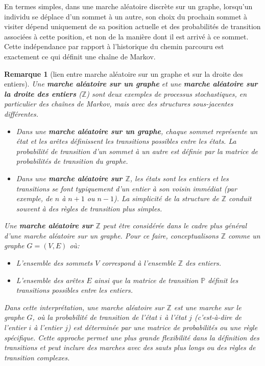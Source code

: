 \documentclass{article}
\theoremstyle{pasdepoint}
\theoremstyle{break}
\theoremstyle{pasdepoint}
\newtheorem*{remark}{Remarque}
\begin{document}
En termes simples, dans une marche aléatoire discrète sur un graphe, lorsqu'un individu se déplace d'un sommet à un autre, son choix du prochain sommet à visiter dépend uniquement de sa position actuelle et des probabilités de transition associées à cette position, et non de la manière dont il est arrivé à ce sommet. Cette indépendance par rapport à l'historique du chemin parcouru est exactement ce qui définit une chaîne de Markov.

\begin{remark}[lien entre marche aléatoire sur un graphe et sur la droite des entiers]
    Une \textbf{marche aléatoire sur un graphe} et une \textbf{marche aléatoire sur la droite des entiers} (\(\mathbb{Z}\)) sont deux exemples de processus stochastiques, en particulier des chaînes de Markov, mais avec des structures sous-jacentes différentes.

\begin{itemize}
    \item Dans une \textbf{marche aléatoire sur un graphe}, chaque sommet représente un état et les arêtes définissent les transitions possibles entre les états. La probabilité de transition d'un sommet à un autre est définie par la matrice de probabilités de transition du graphe.
    \item Dans une \textbf{marche aléatoire sur \(\mathbb{Z}\)}, les états sont les entiers et les transitions se font typiquement d'un entier à son voisin immédiat (par exemple, de \(n\) à \(n+1\) ou \(n-1\)). La simplicité de la structure de \(\mathbb{Z}\) conduit souvent à des règles de transition plus simples.
\end{itemize}

Une \textbf{marche aléatoire sur} \(\mathbb{Z}\) peut être considérée dans le cadre plus général d'une marche aléatoire sur un graphe. Pour ce faire, conceptualisons \(\mathbb{Z}\) comme un graphe \(G = (V, E)\) où:
\begin{itemize}
    \item L'ensemble des sommets \(V\) correspond à l'ensemble \(\mathbb{Z}\) des entiers.
    \item L'ensemble des arêtes \(E\) ainsi que la matrice de transition \(\mathbb{P}\) définit les transitions possibles entre les entiers.
\end{itemize}

Dans cette interprétation, une \textit{marche aléatoire sur} \(\mathbb{Z}\) est une marche sur le graphe \(G\), où la probabilité de transition de l'état \(i\) à l'état \(j\) (c'est-à-dire de l'entier \(i\) à l'entier \(j\)) est déterminée par une matrice de probabilités ou une règle spécifique. Cette approche permet une plus grande flexibilité dans la définition des transitions et peut inclure des marches avec des sauts plus longs ou des règles de transition complexes.
\end{remark}
\end{document}
